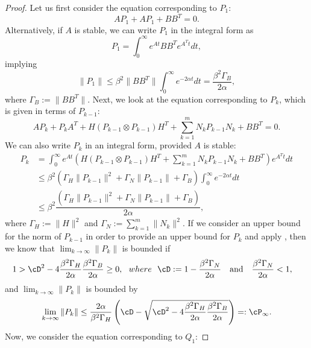 \begin{proof}
	Let us first consider the equation corresponding to $P_1$:
	\begin{equation}
	AP_1 + AP_1 + BB^T = 0.
	\end{equation}
	Alternatively, if $A$ is stable, we can write $P_1$ in the integral form as
	\begin{equation}
	P_1 = \int_0^\infty e^{At}BB^Te^{A^Tt}dt,
	\end{equation}
	implying  
	\begin{equation}
	\|P_1\| \leq \beta^2 \|BB^T\|  \int_0^\infty e^{-2\alpha t}dt = \dfrac{\beta^2\Gamma_B}{2\alpha},
	\end{equation}
where $\Gamma_B := \|BB^T\|$.	Next, we look at the equation corresponding to $P_k$, which is given in terms of $P_{k-1}$:
	\begin{equation}
	AP_k + P_kA^T + H(P_{k-1} \otimes P_{k-1})H^T + \sum_{k=1}^mN_kP_{k-1}N_k + BB^T=0.
	\end{equation}
	We can also write $P_k$ in an integral form, provided $A$ is stable:
	\begin{align*}
	P_k &=\int_0^\infty e^{At}\left(H(P_{k-1} \otimes P_{k-1})H^T + \sum_{k=1}^mN_kP_{k-1}N_k + BB^T\right)e^{A^Tt}dt\\
	&\leq  \beta^2\left(\Gamma_H \|P_{k-1}\|^2 + \Gamma_N\|P_{k-1}\| + \Gamma_B\right)\int_0^\infty e^{-2\alpha t}dt\\
		&\leq \beta^2  \dfrac{\left(\Gamma_H \|P_{k-1}\|^2 + \Gamma_N\|P_{k-1}\| + \Gamma_B\right)}{2\alpha},
	\end{align*}
	where $\Gamma_H := \|H\|^2$ and $\Gamma_N := \sum_{k=1}^m\|N_k\|^2$.
	If we consider an upper bound for the norm of $P_{k-1}$ in order to provide an upper bound for $P_k$ and apply , then we know that $\lim_{k\rightarrow \infty} \|P_k\|$ is bounded if
	\begin{align*}
&1>\cD^2 - 4\dfrac{\beta^2 \Gamma_H}{2\alpha}\dfrac{\beta^2\Gamma_B}{2\alpha} \geq 0, ~~where~~ \cD:= 1-\dfrac{\beta^2\Gamma_N}{2\alpha} \quad\text{and}\quad
 \dfrac{\beta^2\Gamma_N}{2\alpha} <1,
	\end{align*}
	and $\lim_{k\rightarrow \infty} \|P_k\|$ is bounded by 
	\begin{equation*}
	\lim_{k\rightarrow \infty} \|P_k\| \leq \dfrac{2\alpha}{\beta^2\Gamma_H} \left(\cD- \sqrt{\cD^2 - 4\dfrac{\beta^2 \Gamma_H}{2\alpha}\dfrac{\beta^2\Gamma_B}{2\alpha} }\right) =: \cP_\infty.
	\end{equation*}
Now, we consider the equation corresponding to $Q_1$:

\end{proof}
